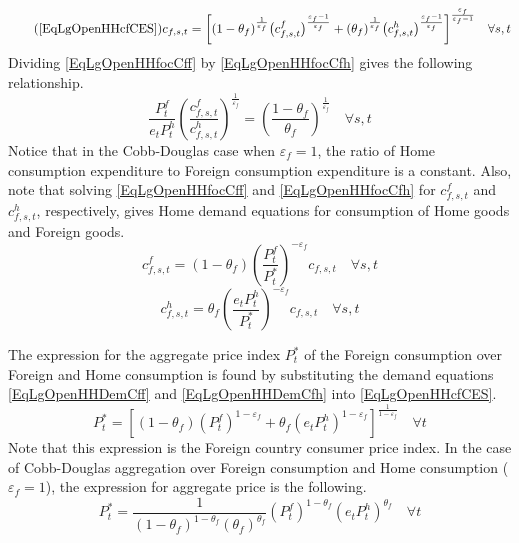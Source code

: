 \documentclass[letterpaper,12pt]{article}
\theoremstyle{definition}
\newcommand\ve{\varepsilon}
\begin{document}
    \begin{equation}\tag{\ref{EqLgOpenHHcfCES}}
      c_{f,s,t}= \biggl[(1 - \theta_f)^\frac{1}{\ve_f}\bigl(c^f_{f,s,t}\bigr)^\frac{\ve_f-1}{\ve_f} + (\theta_f)^\frac{1}{\ve_f}\bigl(c^h_{f,s,t}\bigr)^\frac{\ve_f-1}{\ve_f}\biggr]^\frac{\ve_f}{\ve_f-1} \quad\forall s,t
    \end{equation}
    Dividing \eqref{EqLgOpenHHfocCff} by \eqref{EqLgOpenHHfocCfh} gives the following relationship.
    \begin{equation}\label{EqLgOpenHHFracExpForDom}
      \frac{P^f_t}{e_t P^h_t}\left(\frac{c^f_{f,s,t}}{c^h_{f,s,t}}\right)^{\frac{1}{\ve_f}} = \left(\frac{1-\theta_f}{\theta_f}\right)^{\frac{1}{\ve_f}} \quad\forall s,t
    \end{equation}
    Notice that in the Cobb-Douglas case when $\ve_f=1$, the ratio of Home consumption expenditure to Foreign consumption expenditure is a constant. Also, note that solving \eqref{EqLgOpenHHfocCff} and \eqref{EqLgOpenHHfocCfh} for $c^f_{f,s,t}$ and $c^h_{f,s,t}$, respectively, gives Home demand equations for consumption of Home goods and Foreign goods.
    \begin{equation}\label{EqLgOpenHHDemCff}
          c^f_{f,s,t} = (1-\theta_f)\left(\frac{P^f_t}{P^*_t}\right)^{-\ve_f}c_{f,s,t} \quad\forall s,t
    \end{equation}
    \begin{equation}\label{EqLgOpenHHDemCfh}
          c^h_{f,s,t} = \theta_f \left(\frac{e_t P^h_t}{P^*_t}\right)^{-\ve_f}c_{f,s,t} \quad\forall s,t
    \end{equation}

    The expression for the aggregate price index $P^*_t$ of the Foreign consumption over Foreign and Home consumption is found by substituting the demand equations \eqref{EqLgOpenHHDemCff} and \eqref{EqLgOpenHHDemCfh} into \eqref{EqLgOpenHHcfCES}.
    \begin{equation}\label{EqLgOpenHHaggPrF}
      P^*_t = \left[(1-\theta_f)\left(P^f_t\right)^{1-\ve_f} + \theta_f\left(e_t P^h_t\right)^{1-\ve_f}\right]^{\frac{1}{1-\ve_f}} \quad\forall t
    \end{equation}
    Note that this expression is the Foreign country consumer price index. In the case of Cobb-Douglas aggregation over Foreign consumption and Home consumption ($\ve_f=1$), the expression for aggregate price is the following.
    \begin{equation}\label{EqLgOpenHHaggPrCobbF}
      P^*_t = \frac{1}{(1-\theta_f)^{1-\theta_f}(\theta_f)^{\theta_f}} \left(P^f_t\right)^{1-\theta_f}\left(e_t P^h_t\right)^{\theta_f} \quad\forall t
    \end{equation}
\end{document}
